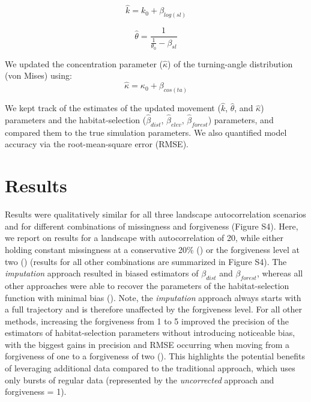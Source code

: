 \documentclass[abstract=on,10pt,a4paper,bibliography=totocnumbered]{article}
\begin{document}
$$
\hat{k} = k_0 + \beta_{log(sl)}
$$

$$
\hat{\theta} = \frac{1}{\frac{1}{\theta_0} - \beta_{sl}}
$$

\noindent We updated the concentration parameter ($\hat{\kappa}$) of the
turning-angle distribution (von Mises) using:
$$
\hat{\kappa} = \kappa_0 + \beta_{cos(ta)}
$$

\noindent We kept track of the  estimates of the updated movement  ($\hat{k}$,
$\hat{\theta}$, and $\hat{\kappa}$) parameters and  the habitat-selection
($\hat{\beta}_{dist}$, $\hat{\beta}_{elev}$, $\hat{\beta}_{forest}$) parameters,
and compared them to the true simulation parameters. We also quantified model
accuracy via the root-mean-square error (RMSE).

\section{Results}

Results were qualitatively similar for all three landscape autocorrelation
scenarios and for different combinations of missingness and forgiveness (Figure
S4). Here, we report on results for a landscape with autocorrelation of 20,
while either holding constant missingness at a conservative 20\%
() or the forgiveness level at two
() (results for all other combinations are
summarized in Figure S4). The \textit{imputation} approach resulted in biased
estimators of $\beta_{dist}$ and $\beta_{forest}$, whereas all other approaches
were able to recover the parameters of the habitat-selection function with
minimal bias (). Note, the \textit{imputation}
approach always starts with a full trajectory and is therefore unaffected by the
forgiveness level. For all other methods, increasing the forgiveness from 1 to 5
improved the precision of the estimators of habitat-selection parameters without
introducing noticeable bias, with the biggest gains in precision and RMSE
occurring when moving from a forgiveness of one to a forgiveness of two
(). This highlights the potential benefits of
leveraging additional data compared to the traditional approach, which uses only
bursts of regular data (represented by the \textit{uncorrected} approach and
forgiveness = 1).
\end{document}
